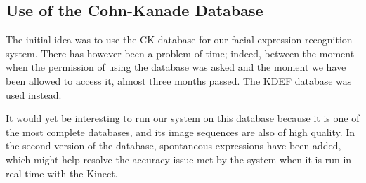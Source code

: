 \subsection{Use of the Cohn-Kanade Database}

\vspace{\baselineskip}
\noindent The initial idea was to use the CK database for our facial expression recognition system. There has however been a problem of time; indeed, between the moment when the permission of using the database was asked and the moment we have been allowed to access it, almost three months passed. The KDEF database was used instead. 
\newline

\noindent It would yet be interesting to run our system on this database because it is one of the most complete databases, and its image sequences are also of high quality. In the second version of the database, spontaneous expressions have been added, which might help resolve the accuracy issue met by the system when it is run in real-time with the Kinect.
\newline

